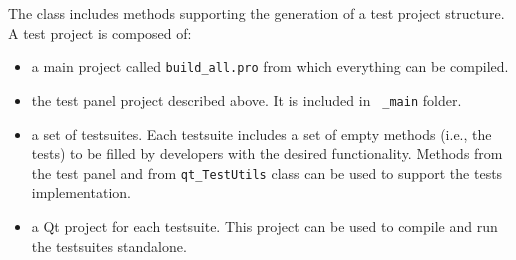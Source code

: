 The  class includes methods supporting
the generation of a test project structure. A test project is composed of:
%
\begin{itemize}
\item a main project called {\tt build\_all.pro} from which everything can
  be compiled.
\item the test panel project described above. It is included in {\tt
  \_main} folder. 
\item a set of testsuites. Each testsuite includes a set of empty methods
  (i.e., the tests) to be filled by developers with the desired
  functionality. Methods from the test panel and from {\tt qt\_TestUtils}
  class can be used to support the tests implementation.
\item a Qt project for each testsuite. This project can be used to compile
  and run the testsuites standalone.
\end{itemize}








\newpage


